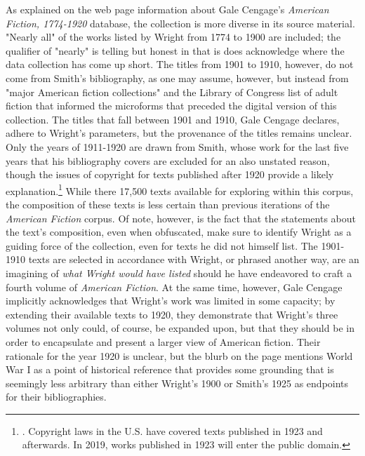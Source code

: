 As explained on the web page information about Gale Cengage's \textit{American Fiction, 1774-1920} database, the collection is more diverse in its source material. "Nearly all" of the works listed by Wright from 1774 to 1900 are included; the qualifier of "nearly" is telling but honest in that is does acknowledge where the data collection has come up short. The titles from 1901 to 1910, however, do not come from Smith's bibliography, as one may assume, however, but instead from "major American fiction collections" and the Library of Congress list of adult fiction that informed the microforms that preceded the digital version of this collection. The titles that fall between 1901 and 1910, Gale Cengage declares, adhere to Wright's parameters, but the provenance of the titles remains unclear. Only the years of 1911-1920 are drawn from Smith, whose work for the last five years that his bibliography covers are excluded for an also unstated reason, though the issues of copyright for texts published after 1920 provide a likely explanation.\footnote{\autocite{noauthor_american_nodate}. Copyright laws in the U.S. have covered texts published in 1923 and afterwards. In 2019, works published in 1923 will enter the public domain.} While there 17,500 texts available for exploring within this corpus, the composition of these texts is less certain than previous iterations of the \textit{American Fiction} corpus. Of note, however, is the fact that the statements about the text's composition, even when obfuscated, make sure to identify Wright as a guiding force of the collection, even for texts he did not himself list. The 1901-1910 texts are selected in accordance with Wright, or phrased another way, are an imagining of \textit{what Wright would have listed} should he have endeavored to craft a fourth volume of \textit{American Fiction}. At the same time, however, Gale Cengage implicitly acknowledges that Wright's work was limited in some capacity; by extending their available texts to 1920, they demonstrate that Wright's three volumes not only could, of course, be expanded upon, but that they should be in order to encapsulate and present a larger view of American fiction. Their rationale for the year 1920 is unclear, but the blurb on the page mentions World War I as a point of historical reference that provides some grounding that is seemingly less arbitrary than either Wright's 1900 or Smith's 1925 as endpoints for their bibliographies. 

